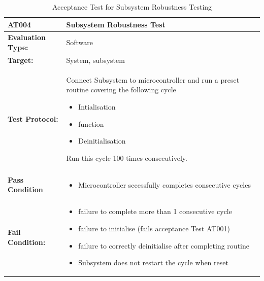 \begin{table}[H]
	\centering
	\caption{Acceptance Test for Subsystem Robustness Testing}
	\begin{tabular}{|m{}|m{}|}
		\hline
		
		\textbf{AT004 }& \textbf{Subsystem Robustness Test} \\
		\hline
		\textbf{Evaluation Type:} & Software \\
		\hline
		\textbf{Target: } & System, subsystem \\
		\hline
		\textbf{Test Protocol:} & Connect Subsystem to microcontroller and run a preset routine covering the following cycle \begin{itemize}
			\item Intialisation
			\item function
			\item Deinitialisation
		\end{itemize} Run this cycle 100 times consecutively.\\
		\hline
		\textbf{Pass Condition} & \vspace{5pt} \begin{itemize}
			\item Microcontroller sccessfully completes consecutive cycles
		\end{itemize} \\
		\hline
		\textbf{Fail Condition:} & \vspace{5pt} \begin{itemize}
			\item  failure to complete more than 1 consecutive cycle
			\item failure to initialise (fails acceptance Test AT001)
			\item failure to correctly deinitialise after completing routine
			\item Subsystem does not restart the cycle when reset
		\end{itemize}\\
		\hline
	\end{tabular}
	
	\label{tab:AT004}
\end{table}


